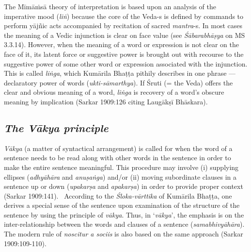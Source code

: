 The Mīmāṁsā theory of interpretation is based upon an analysis of the imperative mood (\textit{liṅ}) because the core of the Veda-s is defined by commands to perform yājñic acts accompanied by recitation of sacred \textit{mantra}-s. In most cases the meaning of a Vedic injunction is clear on face value (see \textit{Śābarabhāṣya} on MS 3.3.14). However, when the meaning of a word or expression is not clear on the face of it, its latent force or suggestive power is brought out with recourse to the suggestive power of some other word or expression associated with the injunction. This is called \textit{liṅga}, which Kumārila Bhaṭṭa pithily describes in one phrase — declaratory power of words (\textit{ukti-sāmarthya}). If Śruti (= the Veda) offers the clear and obvious meaning of a word, \textit{liṅga} is recovery of a word’s obscure meaning by implication (Sarkar 1909:126 citing Laugākṣī Bhāskara).


\subsection*{\textit{The Vākya principle}}

\textit{Vākya} (a matter of syntactical arrangement) is called for when the word of a sentence needs to be read along with other words in the sentence in order to make the entire sentence meaningful. This procedure may involve (i) supplying ellipses (\textit{adhyāhāra} and \textit{anuṣaṅga}) and/or (ii) moving subordinate clauses in a sentence up or down (\textit{upakarṣa} and \textit{apakarṣa}) in order to provide proper context (Sarkar 1909:141).  According to the \textit{Śloka-vārttika} of Kumārila Bhaṭṭa, one derives a special sense of the sentence upon examination of the structure of the sentence by using the principle of \textit{vākya}. Thus, in ‘\textit{vākya}’, the emphasis is on the inter-relationship between the words and clauses of a sentence (\textit{samabhivyāhāra}). The modern rule of \textit{noscitur a sociis} is also based on the same approach (Sarkar 1909:109-110).


